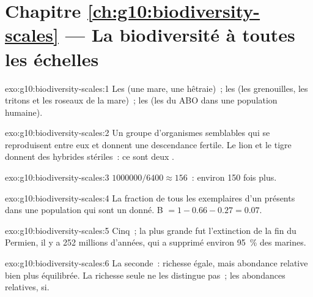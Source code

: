 \section*{Chapitre \ref{ch:g10:biodiversity-scales} --- La biodiversité à toutes les échelles}

\begin{solution}{exo:g10:biodiversity-scales:1}
Les  (une mare, une hêtraie)~; les  (les grenouilles,
les tritons et les roseaux de la mare)~; les  (les  du 
ABO dans une population humaine).
\end{solution}

\begin{solution}{exo:g10:biodiversity-scales:2}
Un groupe d'organismes semblables qui se reproduisent entre eux et
donnent une descendance fertile. Le lion et le tigre donnent des
hybrides stériles~: ce sont deux .
\end{solution}

\begin{solution}{exo:g10:biodiversity-scales:3}
$\num{1000000}/6400 \approx 156$~: environ 150 fois plus.
\end{solution}

\begin{solution}{exo:g10:biodiversity-scales:4}
La fraction de tous les exemplaires d'un  présents dans une
population qui sont un  donné. B $= 1 - 0.66 - 0.27 = 0.07$.
\end{solution}

\begin{solution}{exo:g10:biodiversity-scales:5}
Cinq~; la plus grande fut l'extinction de la fin du Permien, il y a
252 millions d'années, qui a supprimé environ 95~\% des 
marines.
\end{solution}

\begin{solution}{exo:g10:biodiversity-scales:6}
La seconde~: richesse égale, mais abondance relative bien plus
équilibrée. La richesse seule ne les distingue pas~; les abondances
relatives, si.
\end{solution}

